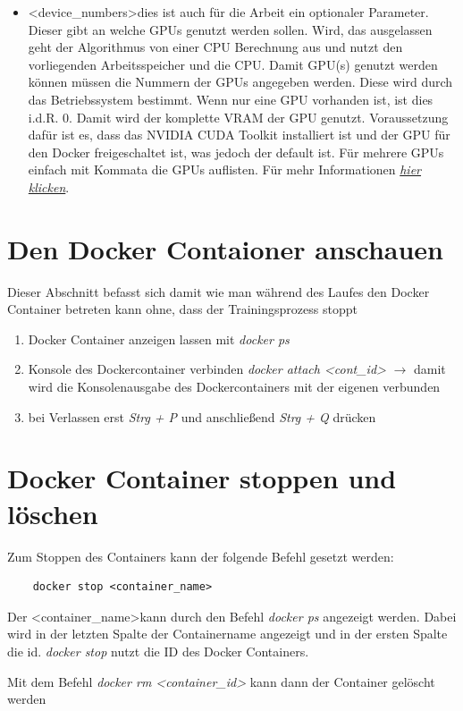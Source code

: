 \begin{itemize}
\begin{itemize}
    \end{itemize}
    \item \textless device\_numbers\textgreater dies ist auch für die Arbeit ein optionaler Parameter. Dieser gibt an welche GPUs genutzt werden sollen. Wird, das ausgelassen geht der Algorithmus von einer CPU Berechnung aus und nutzt den vorliegenden Arbeitsspeicher und die CPU. Damit GPU(s) genutzt werden können müssen die Nummern der GPUs angegeben werden. Diese wird durch das Betriebssystem bestimmt. Wenn nur eine GPU vorhanden ist, ist dies i.d.R. 0. Damit wird der komplette VRAM der GPU genutzt. Voraussetzung dafür ist es, dass das NVIDIA CUDA Toolkit installiert ist und der GPU für den Docker freigeschaltet ist, was jedoch der default ist. Für mehrere GPUs einfach mit Kommata die GPUs auflisten. Für mehr Informationen \textit{\href{https://github.com/ultralytics/yolov5/issues/475}{hier klicken}}.
\end{itemize}

\section{Den Docker Contaioner anschauen}
Dieser Abschnitt befasst sich damit wie man während des Laufes den Docker Container betreten kann ohne, dass der Trainingsprozess stoppt
\begin{enumerate}
    \item Docker Container anzeigen lassen mit \textit{docker ps}
    \item Konsole des Dockercontainer verbinden \textit{docker attach \textless cont\_id\textgreater} $\rightarrow$ damit wird die Konsolenausgabe des Dockercontainers mit der eigenen verbunden
    \item bei Verlassen erst \textit{Strg + P} und anschließend \textit{Strg + Q} drücken 
\end{enumerate}

\section{Docker Container stoppen und löschen}
Zum Stoppen des Containers kann der folgende Befehl gesetzt werden:
\begin{verbatim}
    docker stop <container_name>
\end{verbatim}
Der \textless container\_name\textgreater kann durch den Befehl \textit{docker ps} angezeigt werden. Dabei wird in der letzten Spalte der Containername angezeigt und in der ersten Spalte die id. \textit{docker stop} nutzt die ID des Docker Containers.

Mit dem Befehl \textit{docker rm \textless container\_id\textgreater} kann dann der Container gelöscht werden 